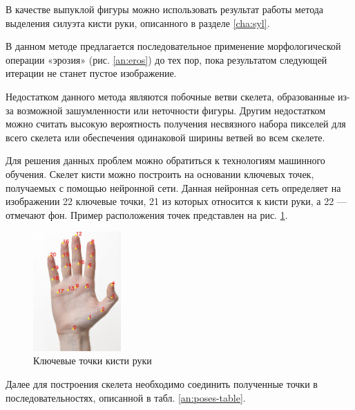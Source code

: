 В качестве выпуклой фигуры можно использовать результат работы метода выделения силуэта кисти руки, описанного в разделе \ref{cha:syl}.

В данном методе предлагается последовательное применение морфологической операции «эрозия» (рис. \ref{an:eros}) до тех пор, пока результатом следующей итерации не станет пустое изображение.

Недостатком данного метода являются побочные ветви скелета, образованные из-за возможной зашумленности или неточности фигуры. Другим недостатком можно считать высокую вероятность получения несвязного набора пикселей для всего скелета или обеспечения одинаковой ширины ветвей во всем скелете.

Для решения данных проблем можно обратиться к технологиям машинного обучения. Скелет кисти можно построить на основании ключевых точек, получаемых с помощью нейронной сети\cite{DNN}. Данная нейронная сеть определяет на изображении 22 ключевые точки, 21 из которых относится к кисти руки, а 22 — отмечают фон. Пример расположения точек представлен на рис. \ref{an:handpose}.

\begin{figure}[!h]
	\centering
	\includegraphics[width=0.3\textwidth]{inc/img/handpose-demo-keypoints}
	\caption{Ключевые точки кисти руки}
	\label{an:handpose}
\end{figure}

Далее для построения скелета необходимо соединить полученные точки в последовательностях, описанной в табл. \ref{an:poses-table}.

